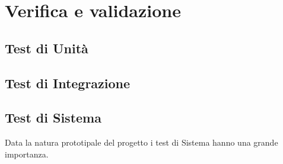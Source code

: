 
\chapter{Verifica e validazione}
\label{cap:verifica-validazione}

\section{Test di Unità}

\section{Test di Integrazione}

\section{Test di Sistema}
Data la natura prototipale del progetto i test di Sistema hanno una grande importanza.